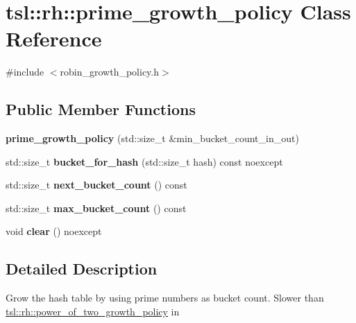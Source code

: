 \hypertarget{classtsl_1_1rh_1_1prime__growth__policy}{}\section{tsl\+::rh\+::prime\+\_\+growth\+\_\+policy Class Reference}
\label{classtsl_1_1rh_1_1prime__growth__policy}


{\ttfamily \#include $<$robin\+\_\+growth\+\_\+policy.\+h$>$}

\subsection*{Public Member Functions}
\begin{DoxyCompactItemize}
\item 
\mbox{\label{classtsl_1_1rh_1_1prime__growth__policy_ad1bd24ab6ae0f9015580f1e2e9bc0d73}} 
{\bfseries prime\+\_\+growth\+\_\+policy} (std\+::size\+\_\+t \&min\+\_\+bucket\+\_\+count\+\_\+in\+\_\+out)
\item 
\mbox{\label{classtsl_1_1rh_1_1prime__growth__policy_a0347fd6283adcd8827100dc086497131}} 
std\+::size\+\_\+t {\bfseries bucket\+\_\+for\+\_\+hash} (std\+::size\+\_\+t hash) const noexcept
\item 
\mbox{\label{classtsl_1_1rh_1_1prime__growth__policy_a3682e02287eba843471537f582ca8156}} 
std\+::size\+\_\+t {\bfseries next\+\_\+bucket\+\_\+count} () const
\item 
\mbox{\label{classtsl_1_1rh_1_1prime__growth__policy_adb93687c90dad0e1b6ae31f7443d2a33}} 
std\+::size\+\_\+t {\bfseries max\+\_\+bucket\+\_\+count} () const
\item 
\mbox{\label{classtsl_1_1rh_1_1prime__growth__policy_aef14e2429e8bf134e8aeb40de6ed9856}} 
void {\bfseries clear} () noexcept
\end{DoxyCompactItemize}


\subsection{Detailed Description}
Grow the hash table by using prime numbers as bucket count. Slower than \mbox{\hyperlink{classtsl_1_1rh_1_1power__of__two__growth__policy}{tsl\+::rh\+::power\+\_\+of\+\_\+two\+\_\+growth\+\_\+policy}} in

